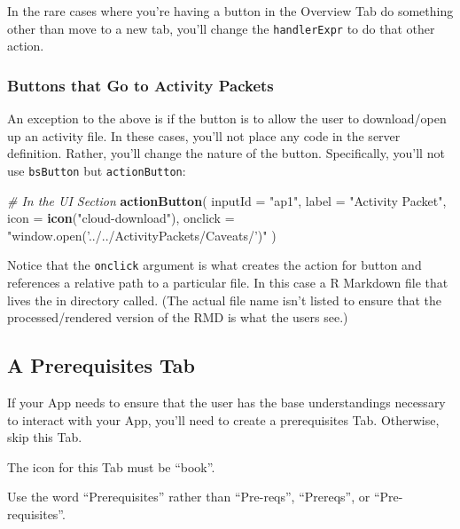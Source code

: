 \documentclass[
]{book}
\newenvironment{Shaded}{\begin{snugshade}}{\end{snugshade}}
\newcommand{\CommentTok}[1]{\textcolor[rgb]{0.56,0.35,0.01}{\textit{#1}}}
\newcommand{\DataTypeTok}[1]{\textcolor[rgb]{0.13,0.29,0.53}{#1}}
\newcommand{\KeywordTok}[1]{\textcolor[rgb]{0.13,0.29,0.53}{\textbf{#1}}}
\newcommand{\NormalTok}[1]{#1}
\newcommand{\StringTok}[1]{\textcolor[rgb]{0.31,0.60,0.02}{#1}}
\begin{document}
In the rare cases where you're having a button in the Overview Tab do something other than move to a new tab, you'll change the \texttt{handlerExpr} to do that other action.

\hypertarget{buttons-that-go-to-activity-packets}{%
\subsubsection{Buttons that Go to Activity Packets}\label{buttons-that-go-to-activity-packets}}

An exception to the above is if the button is to allow the user to download/open up an activity file. In these cases, you'll not place any code in the server definition. Rather, you'll change the nature of the button. Specifically, you'll not use \texttt{bsButton} but \texttt{actionButton}:

\begin{Shaded}
\begin{Highlighting}[]
\CommentTok{# In the UI Section}
\KeywordTok{actionButton}\NormalTok{(}
  \DataTypeTok{inputId =} \StringTok{"ap1"}\NormalTok{,}
  \DataTypeTok{label =} \StringTok{"Activity Packet"}\NormalTok{,}
  \DataTypeTok{icon =} \KeywordTok{icon}\NormalTok{(}\StringTok{"cloud-download"}\NormalTok{),}
  \DataTypeTok{onclick =} \StringTok{"window.open('../../ActivityPackets/Caveats/')"}
\NormalTok{)}
\end{Highlighting}
\end{Shaded}

Notice that the \texttt{onclick} argument is what creates the action for button and references a relative path to a particular file. In this case a R Markdown file that lives the in directory called. (The actual file name isn't listed to ensure that the processed/rendered version of the RMD is what the users see.)

\hypertarget{a-prerequisites-tab}{%
\subsection{A Prerequisites Tab}\label{a-prerequisites-tab}}

If your App needs to ensure that the user has the base understandings necessary to interact with your App, you'll need to create a prerequisites Tab. Otherwise, skip this Tab.

The icon for this Tab must be ``book''.

Use the word ``Prerequisites'' rather than ``Pre-reqs'', ``Prereqs'', or ``Pre-requisites''.
\end{document}
